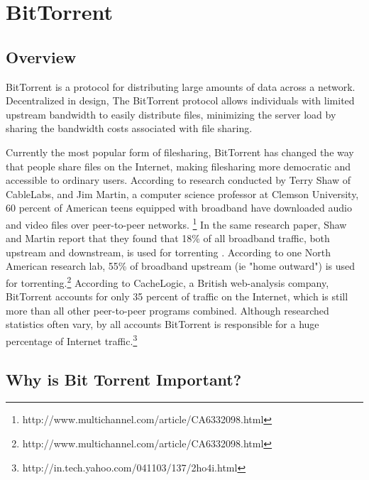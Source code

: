 \documentclass[a4paper,12pt]{report}
\begin{document}
\chapter{BitTorrent}

\section{Overview}
BitTorrent is a protocol for distributing large amounts of data across a network.
Decentralized in design, The BitTorrent protocol allows individuals with limited upstream bandwidth to easily distribute files, minimizing the server load by sharing the bandwidth costs associated with file sharing.


Currently the most popular form of filesharing, BitTorrent has changed the way that people share files on the Internet, making filesharing more democratic and accessible to ordinary users.
According to research conducted by Terry Shaw of CableLabs, and Jim Martin, a computer science professor at Clemson University, 60 percent of American teens equipped with broadband have downloaded audio and video files over peer-to-peer networks. \footnote { http://www.multichannel.com/article/CA6332098.html}
In the same research paper, Shaw and Martin report that they found that 18\% of all broadband traffic, both upstream and downstream, is used for torrenting .
According to one North American research lab, 55\% of broadband upstream (ie "home outward") is used for torrenting.\footnote{http://www.multichannel.com/article/CA6332098.html}
According to CacheLogic, a British web-analysis company, BitTorrent accounts for only 35 percent of traffic on the Internet, which is still more than all other peer-to-peer programs combined.  
Although researched statistics often vary, by all accounts BitTorrent is responsible for a huge percentage of Internet traffic.\footnote {http://in.tech.yahoo.com/041103/137/2ho4i.html}




\section{Why is Bit Torrent Important?}
\end{document}

